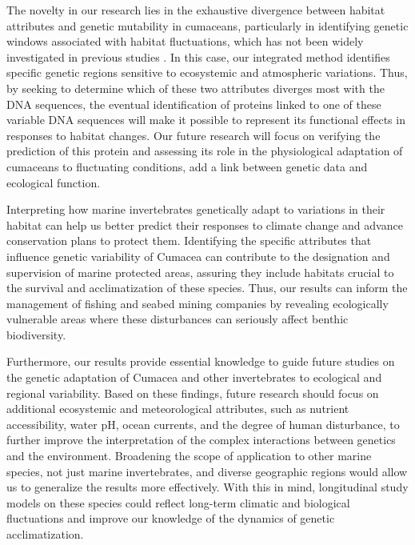 The novelty in our research lies in the exhaustive divergence between habitat attributes and genetic mutability in cumaceans, particularly in identifying genetic windows associated with habitat fluctuations, which has not been widely investigated in previous studies \citep{manel2003landscape, vrijenhoek2009cryptic}. In this case, our integrated method identifies specific genetic regions sensitive to ecosystemic and atmospheric variations. Thus, by seeking to determine which of these two attributes diverges most with the DNA sequences, the eventual identification of proteins linked to one of these variable DNA sequences will make it possible to represent its functional effects in responses to habitat changes. Our future research will focus on verifying the prediction of this protein and assessing its role in the physiological adaptation of cumaceans to fluctuating conditions, add a link between genetic data and ecological function.

Interpreting how marine invertebrates genetically adapt to variations in their habitat can help us better predict their responses to climate change and advance conservation plans to protect them. Identifying the specific attributes that influence genetic variability of Cumacea can contribute to the designation and supervision of marine protected areas, assuring they include habitats crucial to the survival and acclimatization of these species. Thus, our results can inform the management of fishing and seabed mining companies by revealing ecologically vulnerable areas where these disturbances can seriously affect benthic biodiversity. 

Furthermore, our results provide essential knowledge to guide future studies on the genetic adaptation of Cumacea and other invertebrates to ecological and regional variability. Based on these findings, future research should focus on additional ecosystemic and meteorological attributes, such as nutrient accessibility, water pH, ocean currents, and the degree of human disturbance, to further improve the interpretation of the complex interactions between genetics and the environment. Broadening the scope of application to other marine species, not just marine invertebrates, and diverse geographic regions would allow us to generalize the results more effectively. With this in mind, longitudinal study models on these species could reflect long-term climatic and biological fluctuations and improve our knowledge of the dynamics of genetic acclimatization.

